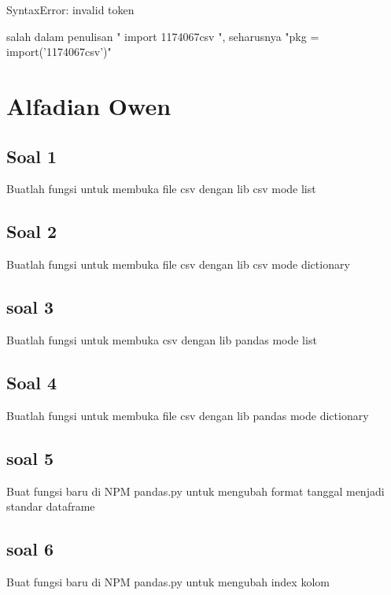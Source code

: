 SyntaxError: invalid token

salah dalam penulisan " import 1174067\textunderscore csv ", seharusnya "pkg = \textunderscore \textunderscore import\textunderscore \textunderscore('1174067\textunderscore csv')"


\section{Alfadian Owen}
\subsection{Soal 1}
Buatlah fungsi untuk membuka file csv dengan lib csv mode list


\subsection{Soal 2}
Buatlah fungsi untuk membuka file csv dengan lib csv mode dictionary


\subsection{soal 3}
Buatlah fungsi  untuk membuka csv dengan lib pandas mode list


\subsection{Soal 4}
Buatlah fungsi untuk membuka file csv dengan lib pandas mode dictionary


\subsection{soal 5}
Buat fungsi baru di NPM pandas.py untuk mengubah format tanggal menjadi standar dataframe


\subsection{soal 6}
Buat fungsi baru di NPM pandas.py untuk mengubah index kolom


